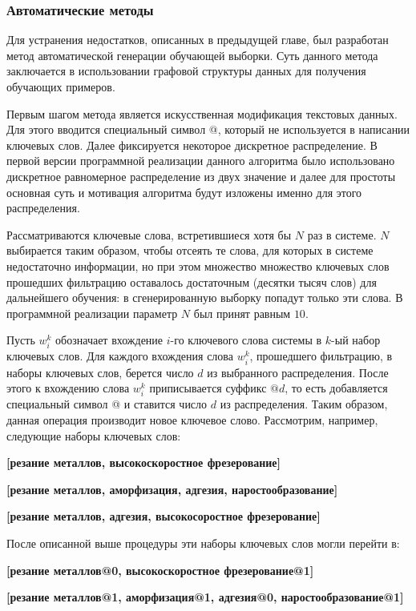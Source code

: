 \subsubsection{Автоматические методы}
Для устранения недостатков, описанных в предыдущей главе, был разработан метод автоматической генерации обучающей выборки. Суть данного метода заключается в использовании графовой структуры данных для получения обучающих примеров.

Первым шагом метода является искусственная модификация текстовых данных. Для этого вводится специальный символ @, который не используется в написании ключевых слов. Далее фиксируется некоторое дискретное распределение. В первой версии программной реализации данного алгоритма было использовано дискретное равномерное распределение из двух значение и далее для простоты основная суть и мотивация алгоритма будут изложены именно для этого распределения.

Рассматриваются ключевые слова, встретившиеся хотя бы $N$ раз в системе. $N$ выбирается таким образом, чтобы отсеять те слова, для которых в системе недостаточно информации, но при этом множество множество  ключевых слов прошедших фильтрацию оставалось достаточным (десятки тысяч слов) для дальнейшего обучения: в сгенерированную выборку попадут только эти слова. В программной реализации параметр $N$ был принят равным $10$. 

Пусть $w_i^k$ обозначает вхождение $i$-го ключевого слова системы в $k$-ый набор ключевых слов. Для каждого вхождения слова $w_i^k$, прошедшего фильтрацию, в наборы ключевых слов, берется число $d$ из выбранного распределения. После этого к вхождению слова $w_i^k$ приписывается суффикс $@d$, то есть добавляется специальный символ @ и ставится число $d$ из распределения. Таким образом, данная операция производит новое ключевое слово. Рассмотрим, например, следующие наборы ключевых слов:

\textbf{[резание металлов, высокоскоростное фрезерование]}\

\textbf{[резание металлов, аморфизация, адгезия, наростообразование]}\

\textbf{[резание металлов, адгезия, высокосоростное фрезерование]}\

После описанной выше процедуры эти наборы ключевых слов могли перейти в:

\textbf{[резание металлов@0, высокоскоростное фрезерование@1]}\

\textbf{[резание металлов@1, аморфизация@1, адгезия@0, наростообразование@1]}\

